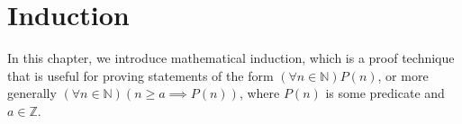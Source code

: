 \chapter{Induction}

In this chapter, we introduce mathematical induction, which is a proof technique that is useful for proving statements of the form $(\forall n \in \mathbb{N})P(n)$, or more generally $(\forall n \in \mathbb{N})(n\geq a\implies P(n))$, where $P(n)$ is some predicate and $a \in \mathbb{Z}$.